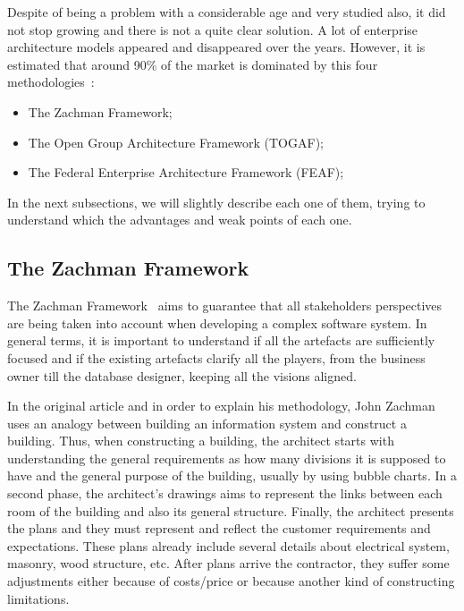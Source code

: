Despite of being a problem with a considerable age and very studied also, it did not stop growing and there is not a quite clear solution. A lot of enterprise architecture models appeared and disappeared over the years. However, it is estimated that around 90\% of the market is dominated by this four methodologies~\citep{Sessions2007}:

\begin{itemize}
\item The Zachman Framework;
\item The Open Group Architecture Framework (TOGAF);
\item The Federal Enterprise Architecture Framework (FEAF);
\end{itemize}

In the next subsections, we will slightly describe each one of them, trying to understand which the advantages and weak points of each one. 











\subsection{The Zachman Framework} \label{sec:zachman-fw}

The Zachman Framework~\citep{Zachman1987} aims to guarantee that all stakeholders perspectives are being taken into account when developing a complex software system. In general terms, it is important to understand if all the artefacts are sufficiently focused and if the existing artefacts clarify all the players, from the business owner till the database designer, keeping all the visions aligned.

In the original article and in order to explain his methodology, John Zachman uses an analogy between building an information system and construct a building. Thus, when constructing a building, the architect starts with understanding the general requirements as how many divisions it is supposed to have and the general purpose of the building, usually by using bubble charts. In a second phase, the architect's drawings aims to represent the links between each room of the building and also its general structure. Finally, the architect presents the plans and they must represent and reflect the customer requirements and expectations. These plans already include several details about electrical system, masonry, wood structure, etc. After plans arrive the contractor, they suffer some adjustments either because of costs/price or because another kind of constructing limitations.

